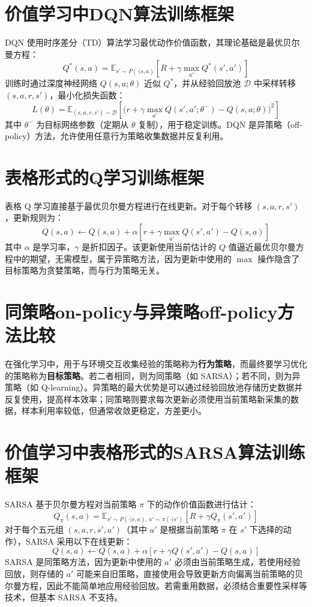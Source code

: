 \documentclass{article}
\begin{document}
\section{价值学习中DQN算法训练框架}
DQN 使用时序差分（TD）算法学习最优动作价值函数，其理论基础是最优贝尔曼方程：
\[
Q^*(s,a) = \mathbb{E}_{s'\sim P(\cdot|s,a)} \left[ R + \gamma \max_{a'} Q^*(s',a') \right] \tag{3}
\]
训练时通过深度神经网络 \(Q(s,a;\theta)\) 近似 \(Q^*\)，并从经验回放池 \(\mathcal{D}\) 中采样转移 \((s,a,r,s')\)，最小化损失函数：
\[
L(\theta) = \mathbb{E}_{(s,a,r,s')\sim\mathcal{D}} \left[ \bigl( r + \gamma \max_{a'} Q(s',a';\theta^-) - Q(s,a;\theta) \bigr)^2 \right] \tag{4}
\]
其中 \(\theta^-\) 为目标网络参数（定期从 \(\theta\) 复制），用于稳定训练。DQN 是异策略（off-policy）方法，允许使用任意行为策略收集数据并反复利用。

\section{表格形式的Q学习训练框架}
表格 Q 学习直接基于最优贝尔曼方程进行在线更新。对于每个转移 \((s,a,r,s')\)，更新规则为：
\[
Q(s,a) \leftarrow Q(s,a) + \alpha \left[ r + \gamma \max_{a'} Q(s',a') - Q(s,a) \right] \tag{5}
\]
其中 \(\alpha\) 是学习率，\(\gamma\) 是折扣因子。该更新使用当前估计的 \(Q\) 值逼近最优贝尔曼方程中的期望，无需模型，属于异策略方法，因为更新中使用的 \(\max\) 操作隐含了目标策略为贪婪策略，而与行为策略无关。

\section{同策略on-policy与异策略off-policy方法比较}
在强化学习中，用于与环境交互收集经验的策略称为\textbf{行为策略}，而最终要学习优化的策略称为\textbf{目标策略}。若二者相同，则为同策略（如 SARSA）；若不同，则为异策略（如 Q-learning）。异策略的最大优势是可以通过经验回放池存储历史数据并反复使用，提高样本效率；同策略则要求每次更新必须使用当前策略新采集的数据，样本利用率较低，但通常收敛更稳定，方差更小。

\section{价值学习中表格形式的SARSA算法训练框架}
SARSA 基于贝尔曼方程对当前策略 \(\pi\) 下的动作价值函数进行估计：
\[
Q_\pi(s,a) = \mathbb{E}_{s'\sim P(\cdot|s,a),\,a'\sim\pi(\cdot|s')} \left[ R + \gamma Q_\pi(s',a') \right] \tag{6}
\]
对于每个五元组 \((s,a,r,s',a')\)（其中 \(a'\) 是根据当前策略 \(\pi\) 在 \(s'\) 下选择的动作），SARSA 采用以下在线更新：
\[
Q(s,a) \leftarrow Q(s,a) + \alpha \left[ r + \gamma Q(s',a') - Q(s,a) \right] \tag{7}
\]
SARSA 是同策略方法，因为更新中使用的 \(a'\) 必须由当前策略生成，若使用经验回放，则存储的 \(a'\) 可能来自旧策略，直接使用会导致更新方向偏离当前策略的贝尔曼方程，因此不能简单地应用经验回放。若需重用数据，必须结合重要性采样等技术，但基本 SARSA 不支持。
\end{document}
